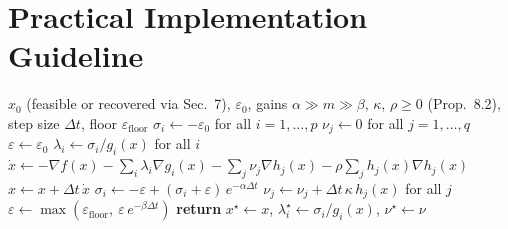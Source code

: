 \documentclass[11pt,onecolumn]{article}
\theoremstyle{definition}
\theoremstyle{remark}
\begin{document}
\section{Practical Implementation Guideline} \label{sec:practical}



\begin{algorithm}[t]
\caption{RNA-KKT: Composed integration loop for constrained AC-OPF}
\label{alg:rna-kkt}
\begin{algorithmic}[1]
\REQUIRE $x_0$ (feasible or recovered via Sec.~7), $\varepsilon_0$, gains $\alpha \gg m \gg \beta$,
$\kappa$, $\rho \ge 0$ (Prop.~8.2), step size $\Delta t$, floor $\varepsilon_{\text{floor}}$
\STATE $\sigma_i \leftarrow -\varepsilon_0$ for all $i = 1,\dots,p$ 
\STATE $\nu_j \leftarrow 0$ for all $j = 1,\dots,q$
\STATE $\varepsilon \leftarrow \varepsilon_0$
    \STATE $\lambda_i \leftarrow \sigma_i / g_i(x)$ for all $i$ 
    \STATE $\dot{x} \leftarrow -\nabla f(x) - \sum_i \lambda_i \nabla g_i(x) - \sum_j \nu_j \nabla h_j(x) - \rho \sum_j h_j(x) \nabla h_j(x)$
    \STATE $x \leftarrow x + \Delta t \, \dot{x}$ 
        \STATE $\sigma_i \leftarrow -\varepsilon + (\sigma_i + \varepsilon)\, e^{-\alpha \Delta t}$ 
    \ENDFOR
    \STATE $\nu_j \leftarrow \nu_j + \Delta t\, \kappa\, h_j(x)$ for all $j$ 
    \STATE $\varepsilon \leftarrow \max(\varepsilon_{\text{floor}},\ \varepsilon\, e^{-\beta \Delta t})$ 
\ENDWHILE
\STATE \textbf{return} $x^\star \leftarrow x$, $\lambda^\star_i \leftarrow \sigma_i/g_i(x)$, $\nu^\star \leftarrow \nu$
\end{algorithmic}
\end{algorithm}
\end{document}
